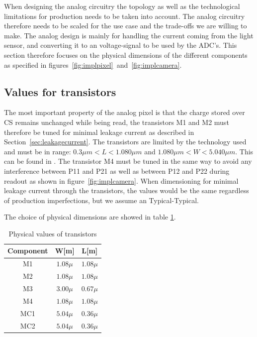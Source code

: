 
When designing the analog circuitry the topology as well as the technological limitations for production needs to be taken into account. The analog circuitry therefore needs to be scaled for the use case and the trade-offs we are willing to make.
The analog design is mainly for handling the current coming from the light sensor, and converting it to an voltage-signal to be used by the ADC's.
This section therefore focuses on the physical dimensions of the different components as specified in figures~\ref{fig:implpixel}~and~\ref{fig:implcamera}.

\subsection{Values for transistors}

The most important property of the analog pixel is that the charge stored over CS remains unchanged while being read,
the transistors M1 and M2 must therefore be tuned for minimal leakage current as described in Section~\ref{sec:leakagecurrent}.
The transistors are limited by the technology used and must be in range: $0.3 \mu m < L < 1.080 \mu m$ and $1.080 \mu m < W < 5.040 \mu m $. This can be found in \cite{oppgave}.
The transistor M4 must be tuned in the same way to avoid any interference between P11 and P21 as well as between P12 and P22 during readout as shown in figure~\ref{fig:implcamera}.
When dimensioning for minimal leakage current through the transistors, the values would be the same regardless of production imperfections, but we assume an Typical-Typical.

The choice of physical dimensions are showed in table \ref{tab:transcomponentvalues}.

\begin{table}[htbp]
  \centering
  \caption{Physical values of transistors}
  \begin{tabular}{ c | c c }
    Component & W[m] & L[m] \\
    \midrule
    M1 & $1.08\mu$ & $1.08\mu$ \\
    M2 & $1.08\mu$ & $1.08\mu$ \\
    M3 & $3.00\mu$ & $0.67\mu$ \\
    M4 & $1.08\mu$ & $1.08\mu$ \\
    MC1 & $5.04\mu$ & $0.36\mu$ \\
    MC2 & $5.04\mu$ & $0.36\mu$
  \end{tabular}
  \label{tab:transcomponentvalues}
\end{table}



